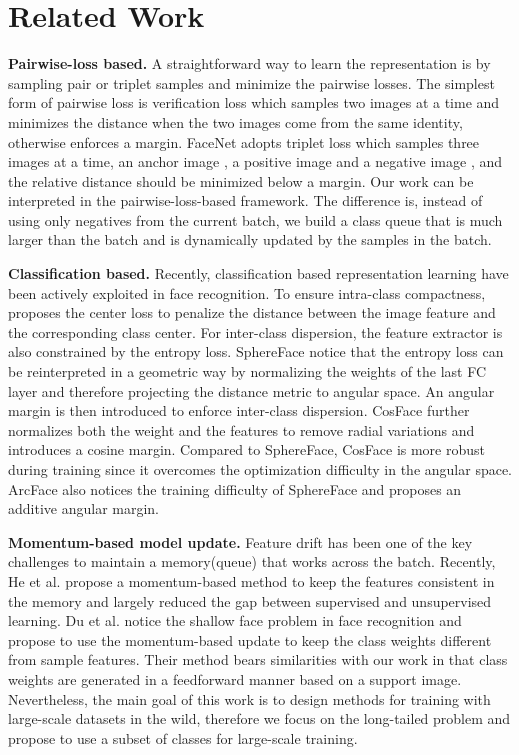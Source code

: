 \documentclass[10pt,twocolumn,letterpaper]{article}
\begin{document}
\section{Related Work}
\textbf{Pairwise-loss based.} A straightforward way to learn the representation is by sampling pair or triplet samples\cite{chopra2005learning,hoffer2015deep,wang2014learning} and minimize the pairwise losses. The simplest form of pairwise loss is verification loss which samples two images at a time and minimizes the  distance when the two images come from the same identity, otherwise enforces a margin. 
FaceNet\cite{schroff2015facenet} adopts triplet loss which samples three images at a time, an anchor image , a positive image  and a negative image , and the relative distance  should be minimized below a margin. 
Our work can be interpreted in the pairwise-loss-based framework. The difference is, 
instead of using only negatives from the current batch, we build a class queue that is much larger than the batch and is dynamically updated by the samples in the batch.

\textbf{Classification based.} Recently, classification based representation learning have been actively exploited in face recognition\cite{wen2016discriminative,liu2017sphereface,wang2018additive,wang2018cosface,deng2019arcface}.
To ensure intra-class compactness, \cite{wen2016discriminative} proposes the center loss to penalize the distance between the image feature and the corresponding class center. For inter-class dispersion, the feature extractor is also constrained by the entropy loss. SphereFace\cite{liu2017sphereface,liu2016large} notice that the entropy loss can be reinterpreted in a geometric way by  normalizing the weights of the last FC layer and therefore projecting the distance metric to angular space. An angular margin is then introduced to enforce inter-class dispersion. CosFace\cite{wang2018cosface} further normalizes both the weight and the features to remove radial variations and introduces a cosine margin. Compared to SphereFace\cite{liu2017sphereface}, CosFace is more robust during training since it overcomes the optimization difficulty in the angular space. ArcFace\cite{deng2019arcface} also notices the training difficulty of SphereFace and proposes an additive angular margin.

\textbf{Momentum-based model update.} Feature drift has been one of the key challenges to maintain a memory(queue) that works across the batch. Recently, He et al.\cite{he_momentum_2020} propose a momentum-based method to keep the features consistent in the memory and largely reduced the gap between supervised and unsupervised learning. Du et al.\cite{du_semi-siamese_2020} notice the shallow face problem in face recognition and propose to use the momentum-based update to keep the class weights different from sample features. Their method bears similarities with our work in that class weights are generated in a feedforward manner based on a support image. Nevertheless, the main goal of this work is to design methods for training with large-scale datasets in the wild, therefore we focus on the long-tailed problem and propose to use a subset of classes for large-scale training.
\end{document}
